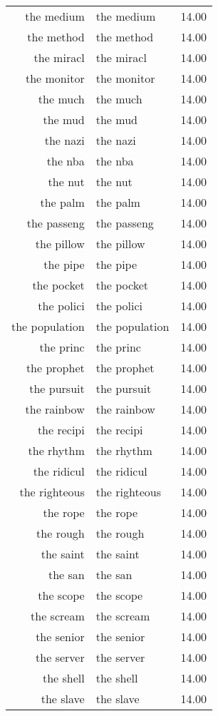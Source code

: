 \begin{table}[ht]
\begin{tabular}{rlr}
  the medium & the medium & 14.00 \\ 
  the method & the method & 14.00 \\ 
  the miracl & the miracl & 14.00 \\ 
  the monitor & the monitor & 14.00 \\ 
  the much & the much & 14.00 \\ 
  the mud & the mud & 14.00 \\ 
  the nazi & the nazi & 14.00 \\ 
  the nba & the nba & 14.00 \\ 
  the nut & the nut & 14.00 \\ 
  the palm & the palm & 14.00 \\ 
  the passeng & the passeng & 14.00 \\ 
  the pillow & the pillow & 14.00 \\ 
  the pipe & the pipe & 14.00 \\ 
  the pocket & the pocket & 14.00 \\ 
  the polici & the polici & 14.00 \\ 
  the population & the population & 14.00 \\ 
  the princ & the princ & 14.00 \\ 
  the prophet & the prophet & 14.00 \\ 
  the pursuit & the pursuit & 14.00 \\ 
  the rainbow & the rainbow & 14.00 \\ 
  the recipi & the recipi & 14.00 \\ 
  the rhythm & the rhythm & 14.00 \\ 
  the ridicul & the ridicul & 14.00 \\ 
  the righteous & the righteous & 14.00 \\ 
  the rope & the rope & 14.00 \\ 
  the rough & the rough & 14.00 \\ 
  the saint & the saint & 14.00 \\ 
  the san & the san & 14.00 \\ 
  the scope & the scope & 14.00 \\ 
  the scream & the scream & 14.00 \\ 
  the senior & the senior & 14.00 \\ 
  the server & the server & 14.00 \\ 
  the shell & the shell & 14.00 \\ 
  the slave & the slave & 14.00 \\ 

\end{tabular}
\end{table}
